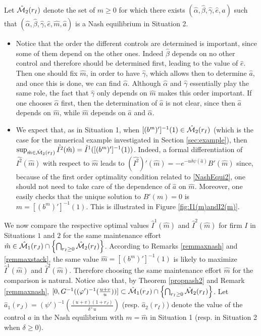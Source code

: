 \documentclass{svjour3}
\begin{document}
\noindent Let $\hat{\cal M}_2(r_I)$ denote the set of $\hat m\geq 0$ for which there exists $(\hat\alpha, \hat\beta, \hat\gamma, \hat e,\hat a)$ such that $(\hat\alpha, \hat\beta, \hat\gamma, \hat e,\hat m, \hat a)$ is a Nash equilibrium in Situation 2. 

\begin{remark}
\label{remmaxstack}
\begin{itemize}
   \item Notice that the order the different controls are determined is important, since some of them depend on the other ones. Indeed $\hat\beta$ depends on no other control and therefore should be determined first, leading to the value of $\hat e$. Then one should fix $\hat m$, in order to have $\hat\gamma$, which allows then to determine $\hat a$, and once this is done, we can find $\hat\alpha$. Although $\hat\alpha$ and $\hat\gamma$ essentially play the same role, the fact that $\hat\gamma$ only depends on $\hat m$ makes this order important. If one chooses $\hat\alpha$ first, then the determination of $\hat a$ is not clear, since then $\hat a$ depends on $\hat m$, while $\hat m$ depends on $\hat a$ and $\hat\alpha$.
\item We expect that, as in Situation 1, when $[(b^m)']^{-1}(1)\in\hat{\cal M}_2(r_I)$ { (which is the case for the numerical example investigated in Section \ref{sec:example})}, then $\sup_{\hat{m}\in\hat{\cal M}_2(r_I)}\hat{I^2}(\hat{m})=\hat{I}^1([(b^m)']^{-1}(1))$. Indeed, a formal differentiation of $\hat{I^2}(\hat m)$ with respect to $\hat{m}$ leads to 
$(\hat{I^2})'(\hat m)=-e^{-u\delta\psi(\hat a)}
B'(\hat m)$ since, because of the first order optimality condition related to 
\eqref{NashEqui2}, one should not need to take care of the dependence of $\hat a$ on $\hat m$. Moreover, one easily checks that the unique solution to $B'(m)=0$ is $m=[(b^m)']^{-1}(1)$. This is illustrated in Figure \ref{fig:I1(m)andI2(m)}.
\end{itemize}
\end{remark}

We now compare the respective optimal values $\hat I^1(\hat m)$ and $\hat I^2(\hat m)$ for firm $I$ in Situations $1$ and $2$ for the same maintenance effort
 $\hat{m}\in\hat{\cal M}_1(r_J)\cap\left\{\bigcap_{r_I\geq 0}\hat{\cal M}_2(r_I)\right\}$. 
According to Remarks \ref{remmaxnash} and \ref{remmaxstack}, the same value $\hat m=[(b^m)']^{-1}(1)$ is likely to maximize  $ \hat{I}^1(\hat m)$ and    $\hat{I}^2(\hat m)$. Therefore choosing the same maintenance effort $\hat{m}$ for the comparison is natural.
Notice also that, by Theorem \ref{propnash2} and Remark \ref{remmaxnash},  $[0,G^{-1}((\varphi')^{-1}(\frac{u+v}{u}))]\subset\hat{\cal M}_1(r_J)\cap\left\{\bigcap_{r_I\geq 0}\hat{\cal M}_2(r_I)\right\}$. Let $\hat a_1(r_J)=(\psi')^{-1}\left(\frac{(u+v)(1+r_J)}{\delta^+ u}\right)$ (resp. $\hat a_2(r_I)$) denote the value of the control $a$ in the Nash equilibrium with $m=\hat{m}$ in Situation 1 (resp. in Situation 2 when $\delta\geq 0$).
\end{document}
